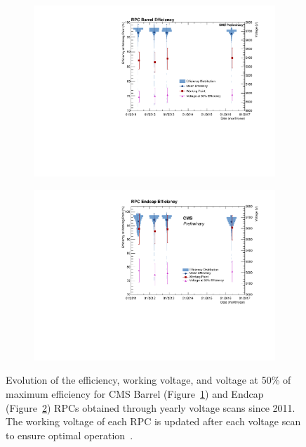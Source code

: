 	\begin{figure}[H]
		\hspace*{-0.05\plotwidth}
		\begin{subfigure}{0.5\linewidth}
			\centering
			\includegraphics[width = 0.7\plotwidth]{fig/chapt4/HVScanSummaryBarrel.pdf}
			\caption{\label{fig:CMSRPCperf:A}}
		\end{subfigure}
		\begin{subfigure}{0.5\linewidth}
			\centering
			\includegraphics[width = 0.7\plotwidth]{fig/chapt4/HVScanSummaryEndcap.pdf}
			\caption{\label{fig:CMSRPCperf:B}}
		\end{subfigure}
		\caption{\label{fig:CMSRPCperf} Evolution of the efficiency, working voltage, and voltage at 50\% of maximum efficiency for CMS Barrel (Figure~\ref{fig:CMSRPCperf:A}) and Endcap (Figure~\ref{fig:CMSRPCperf:B}) RPCs obtained through yearly voltage scans since 2011. The working voltage of each RPC is updated after each voltage scan to ensure optimal operation~\cite{SHAH2018}.}
	\end{figure}
	
